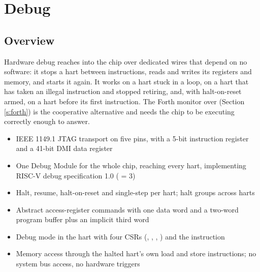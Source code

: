 \chapter{Debug} \label{s:debug}

\section{Overview}

Hardware debug reaches into the chip over dedicated wires that depend on no software: it stops a hart between instructions, reads and writes its registers and memory, and starts it again. It works on a hart stuck in a loop, on a hart that has taken an illegal instruction and stopped retiring, and, with halt-on-reset armed, on a hart before its first instruction. The Forth monitor over  (Section \ref{s:forth}) is the cooperative alternative and needs the chip to be executing correctly enough to answer.

\begin{itemize}
	\item IEEE 1149.1 JTAG transport on five pins, with a 5-bit instruction register and a 41-bit DMI data register
	\item One Debug Module for the whole chip, reaching every hart, implementing RISC-V debug specification 1.0 ( = 3)
	\item Halt, resume, halt-on-reset and single-step per hart; halt groups across harts
	\item Abstract access-register commands with one data word and a two-word program buffer plus an implicit third word
	\item Debug mode in the hart with four CSRs (, , , ) and the  instruction
	\item Memory access through the halted hart's own load and store instructions; no system bus access, no hardware triggers
\end{itemize}

